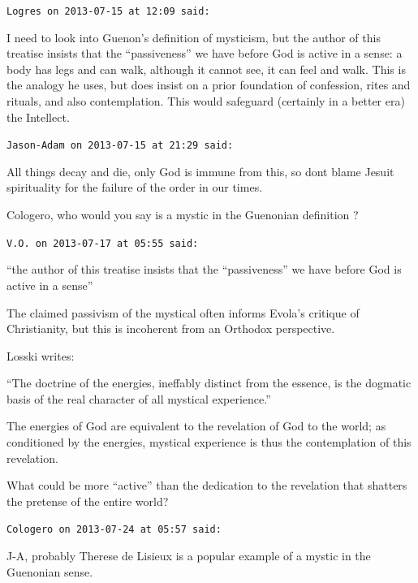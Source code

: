 \begin{footnotesize}
\begin{sffamily}
\texttt{Logres on 2013-07-15 at 12:09 said:}

I need to look into Guenon's definition of mysticism, but the author of this treatise insists that the ``passiveness'' we have before God is active in a sense: a body has legs and can walk, although it cannot see, it can feel and walk. This is the analogy he uses, but does insist on a prior foundation of confession, rites and rituals, and also contemplation. This would safeguard (certainly in a better era) the Intellect.

\hfill

\texttt{Jason-Adam on 2013-07-15 at 21:29 said:}

All things decay and die, only God is immune from this, so dont blame Jesuit spirituality for the failure of the order in our times.

Cologero, who would you say is a mystic in the Guenonian definition ?

\hfill

\texttt{V.O. on 2013-07-17 at 05:55 said:}

``the author of this treatise insists that the ``passiveness'' we have before God is active in a sense''

The claimed passivism of the mystical often informs Evola's critique of Christianity, but this is incoherent from an Orthodox perspective.

Losski writes:

``The doctrine of the energies, ineffably distinct from the essence, is the dogmatic basis of the real character of all mystical experience.''

The energies of God are equivalent to the revelation of God to the world; as conditioned by the energies, mystical experience is thus the contemplation of this revelation.

What could be more ``active'' than the dedication to the revelation that shatters the pretense of the entire world?

\hfill

\texttt{Cologero on 2013-07-24 at 05:57 said:}

J-A, probably Therese de Lisieux is a popular example of a mystic in the Guenonian sense.


\hfill

\end{sffamily}
\end{footnotesize}

